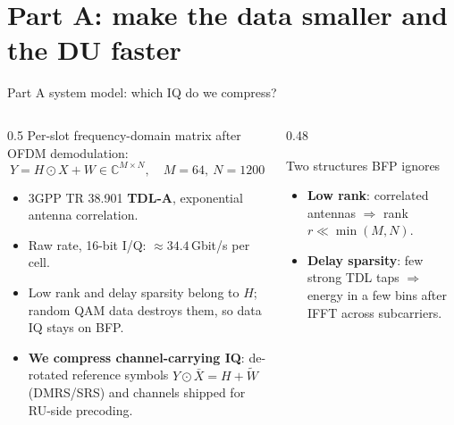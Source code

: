 \documentclass[aspectratio=169,10pt,xcolor={table,dvipsnames}]{beamer}
\begin{document}
\section{Part A: make the data smaller and the DU faster}

\begin{frame}{Part A system model: which IQ do we compress?}
\begin{columns}[T]
\begin{column}{0.5\textwidth}
\footnotesize
Per-slot frequency-domain matrix after OFDM demodulation:
\[ Y = H \odot X + W \in \mathbb{C}^{M\times N},\quad M{=}64,\ N{=}1200 \]
\begin{itemize}
  \item 3GPP TR 38.901 \textbf{TDL-A}, exponential antenna correlation.
  \item Raw rate, 16-bit I/Q: $\approx \mathbf{34.4}$\,Gbit/s per cell.
  \item Low rank and delay sparsity belong to $H$; random QAM data destroys them, so data IQ stays on BFP.
  \item \textbf{We compress channel-carrying IQ}: de-rotated reference symbols $Y \odot \bar X = H + \tilde W$ (DMRS/SRS) and channels shipped for RU-side precoding.
\end{itemize}
\end{column}
\begin{column}{0.48\textwidth}
\begin{block}{Two structures BFP ignores}
\begin{itemize}\small
  \item \textbf{Low rank}: correlated antennas $\Rightarrow$ rank $r \ll \min(M,N)$.
  \item \textbf{Delay sparsity}: few strong TDL taps $\Rightarrow$ energy in a few bins after IFFT across subcarriers.
\end{itemize}
\end{block}
\vspace{0.3em}
\centering
{}
\end{column}
\end{columns}
\end{frame}
\end{document}
